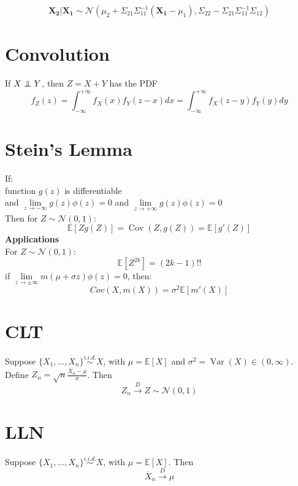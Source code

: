 \documentclass[twocolumn]{amsart}
\newcommand{\E}{\mathbb{E}}
\newcommand{\Cov}{\operatorname{Cov}}
\newcommand{\Var}{\operatorname{Var}}
\newcommand\independent{\protect\mathpalette{\protect\independenT}{\perp}}
\def\independenT#1#2{\mathrel{\rlap{$#1#2$}\mkern3mu{#1#2}}}
\begin{document}
\begin{equation*}
  \boldsymbol{X_{2}} | \boldsymbol{X_{1}} \sim \mathcal{N}(\mu_{2}+\Sigma_{21}\Sigma_{11}^{-1}(\boldsymbol{X_{1}} - \mu_{1}),\Sigma_{22} - \Sigma_{21}\Sigma_{11}^{-1}\Sigma_{12})
\end{equation*}

\section*{Convolution}
If \(X \independent Y\), then \(Z = X + Y\) has the PDF
\begin{equation*}
  f_{Z}(z) = \int_{-\infty}^{+\infty} f_{X}(x) f_{Y}(z-x) dx = \int_{-\infty}^{+\infty} f_{X}(z-y) f_{Y}(y) dy
\end{equation*}

\section*{Stein's Lemma}
If:\\
function \(g(z)\) is differentiable\\
and \(\lim\limits_{z\to-\infty} g(z)\phi(z) = 0\) and \(\lim\limits_{z\to+\infty} g(z)\phi(z) = 0\) \\
Then for \(Z\sim\mathcal{N}(0, 1)\):
\begin{equation*}
  \E[Z g(Z)] = \Cov(Z, g(Z)) = \E[g'(Z)]
\end{equation*}
\textbf{Applications}\\
For \(Z\sim\mathcal{N}(0,1)\):
\begin{equation*}
  \E[Z^{2k}] = (2k - 1)!!
\end{equation*}
if \(\lim\limits_{z\to\pm\infty} m(\mu + \sigma z)\phi(z)=0\), then:
\begin{equation*}
  Cov(X,m(X)) = \sigma^{2}\E[m'(X)]
\end{equation*}

\section*{CLT}
Suppose \(\{X_{1},\ldots,X_{n}\} \overset{i.i.d.}{\sim} X\), with \(\mu = \E[X]\) and \(\sigma^{2} = \Var(X) \in (0, \infty)\). Define \(Z_{n}=\sqrt{n}\frac{\overline{X}_{n}-\mu}{\sigma}\). Then
\begin{equation*}
  Z_{n} \overset{D}{\longrightarrow} Z\sim\mathcal{N}(0,1)
\end{equation*}

\section*{LLN}
Suppose \(\{X_{1},\ldots,X_{n}\} \overset{i.i.d.}{\sim} X\), with \(\mu = \E[X]\). Then
\begin{equation*}
  \overline{X}_{n} \overset{D}{\longrightarrow} \mu
\end{equation*}
\end{document}
